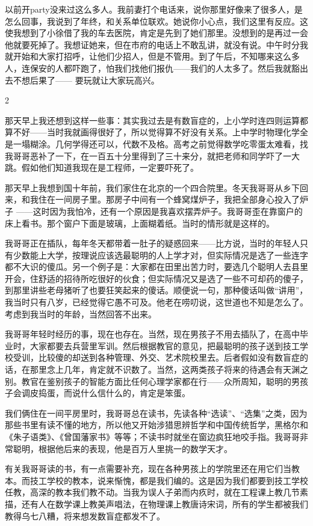 以前开party没来过这么多人。我前妻打个电话来，说你那里好像来了很多人，是怎么回事，我说到了年终，和关系单位联欢。她说你小心点，我们这里有反应。这使我想到了小徐借了我的车去医院，肯定是先到了她们那里。没想到的是再过一会他就要死掉了。我想证她来，但在市府的电话上不敢乱讲，就没有说。中午时分我就开始和大家打招呼，让他们少招人，但是不管用。到了午后，不知哪来这么多人，连保安的人都吓跑了，怕我们找他们报仇——我们的人太多了。然后我就豁出去不想后果了—— 要玩就让大家玩高兴。 



2 

那天早上我还想到这样一些事：其实我过去是有数盲症的，上小学时连四则运算都算不好——当时我就画得很好了，所以觉得算不好没有关系。上中学时物理化学全是一塌糊涂。几何学得还可以，代数不及格。高考之前觉得数学吃零蛋太难看，找我哥哥恶补了一下，在一百五十分里得到了三十来分，就把老师和同学吓了一大跳。假如他们知道我现在是工程师，一定要吓死了。 

那天早上我想到国十年前，我们家住在北京的一个四合院里。冬天我哥哥从乡下回来，和我住在一间房子里。那房子中间有一个蜂窝煤炉子，我把全部身心投入了炉子 ——这时因为我怕冷，还有一个原因是我喜欢摆弄炉子。我哥哥歪在靠窗户的床上看书。那个窗户下面是玻璃，上面糊着纸。当时的情形就是这样的。 



我哥哥正在插队，每年冬天都带着一肚子的疑惑回来——比方说，当时的年轻人只有少数能上大学，按理说应该选最聪明的人上学才对，但实际情况是选了一些连字都不大识的傻瓜。另一个例子是：大家都在田里出苦力时，要选几个聪明人去县里开会，住舒适的招待所吃很好的伙食；但实际情况又是选了一些不可却药的傻子，到那里讲些老母猪听了也要狂笑起来的傻话。顺便说一句，那种傻话叫做“讲用”，我当时只有八岁，已经觉得它愚不可及。他老在唠叨说，这世道也不知是怎么了。考虑到我当时的年龄，当然回答不出来。 

我哥哥年轻时经历的事，现在也存在。当然，现在男孩子不用去插队了，在高中毕业时，大家都要去兵营里军训。然后根据教官的意见，把最聪明的孩子送到技工学校受训，比较傻的却送到各种管理、外交、艺术院校里去。后者假如没有数盲症的话，在那里念上几年，肯定就不识数了。当然，这两类孩子将来的待遇会有天渊之别。教官在鉴别孩子的智能方面比任何心理学家都在行——众所周知，聪明的男孩子会调皮捣蛋，而说什么信什么的，肯定是笨蛋。 

我们俩住在一间平房里时，我哥哥总在读书，先读各种“选读”、“选集”之类，因为那些书里有读不懂的地方，所以他又开始涉猎思辨哲学和中国传统哲学，黑格尔和《朱子语类》、《曾国藩家书》等等；不读书时就坐在窗边疯狂地咬手指。我哥哥非常聪明，根据他后来的表现，他是百万人里挑一的数学天才。 

有关我哥哥读的书，有一点需要补充，现在各种男孩上的学院里还在用它们当教本。而技工学校的教本，说来惭愧，都是我们编的。这是因为我们都要到技工学校任教，高深的教本我们教不动。当我为误人子弟而内疚时，就在工程课上教几节素描，还有人在数学课上教美声唱法，在物理课上教唐诗宋词，所有的学生都被我们教得乌七八糟，将来想发数盲症都发不了。 

